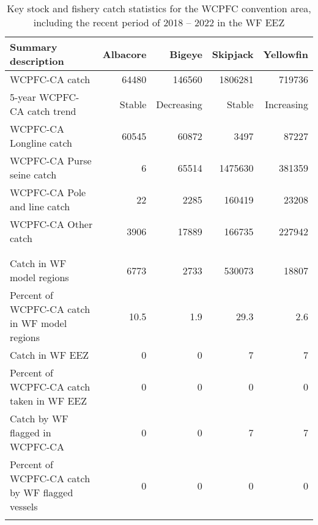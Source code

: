\begin{longtable}{lrrrr}
\caption{Key stock and fishery catch statistics for the WCPFC convention area, including the recent period of 2018 -- 2022 in the WF EEZ} \\ 
  \hline
Summary description & Albacore & Bigeye & Skipjack & Yellowfin \\ 
  \hline
WCPFC-CA catch & 64480 & 146560 & 1806281 & 719736 \\ 
  5-year WCPFC-CA catch trend & Stable & Decreasing & Stable & Increasing \\ 
  WCPFC-CA Longline catch & 60545 & 60872 & 3497 & 87227 \\ 
  WCPFC-CA Purse seine catch & 6 & 65514 & 1475630 & 381359 \\ 
  WCPFC-CA Pole and line catch & 22 & 2285 & 160419 & 23208 \\ 
  WCPFC-CA Other catch & 3906 & 17889 & 166735 & 227942 \\ 
   &  &  &  &  \\ 
   \hline
 &  &  &  &  \\ 
  Catch in WF model regions & 6773 & 2733 & 530073 & 18807 \\ 
  Percent of WCPFC-CA catch in WF model regions & 10.5 & 1.9 & 29.3 & 2.6 \\ 
  Catch in WF EEZ & 0 & 0 & 7 & 7 \\ 
  Percent of WCPFC-CA catch taken in WF EEZ & 0 & 0 & 0 & 0 \\ 
  Catch by WF flagged in WCPFC-CA & 0 & 0 & 7 & 7 \\ 
  Percent of WCPFC-CA catch by WF flagged vessels & 0 & 0 & 0 & 0 \\ 
  \hline
\label{cat_sum_tab}
\end{longtable}
